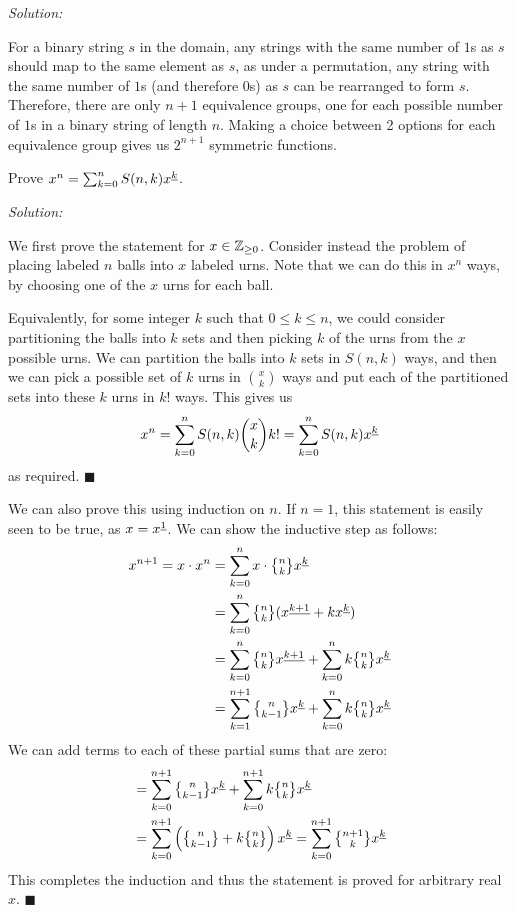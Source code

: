 \documentclass[12pt]{scrartcl}
\newenvironment{problem}[2][Problem]{\begin{trivlist}
\item[\hskip \labelsep {\bfseries #1}\hskip \labelsep {\bfseries #2.}]}{\end{trivlist}}
\newenvironment{solution}
    {\emph{Solution:}
    }
    {
    \qedhere
    }
\begin{document}
\begin{solution}
For a binary string $s$ in the domain, any strings with the same number of $1$s as $s$ should map to the same element as $s$, as under a permutation, any string with the same number of $1$s (and therefore $0$s) as $s$ can be rearranged to form $s$. Therefore, there are only $n+1$ equivalence groups, one for each possible number of $1$s in a binary string of length $n$. Making a choice between 2 options for each equivalence group gives us $\boxed{2^{n+1}}$ symmetric functions. 
\end{solution}


\begin{problem}{10}
Prove $x^n = \sum^n_{k=0} S(n, k) x^{\underline{k}}$. 
\end{problem}

\begin{solution}
We first prove the statement for $x \in \mathbb Z_{\geq 0}$. Consider instead the problem of placing labeled $n$ balls into $x$ labeled urns. Note that we can do this in $x^n$ ways, by choosing one of the $x$ urns for each ball. 

Equivalently, for some integer $k$ such that $0 \leq k \leq n$, we could consider partitioning the balls into $k$ sets and then picking $k$ of the urns from the $x$ possible urns. We can partition the balls into $k$ sets in $S(n, k)$ ways, and then we can pick a possible set of $k$ urns in $\binom{x}{k}$ ways and put each of the partitioned sets into these $k$ urns in $k!$ ways. This gives us 
\[
	x^n = \sum^n_{k=0} S(n, k)\binom{x}{k} k!  = \sum^n_{k=0} S(n, k) x^{\underline{k}}
\]
as required. $\blacksquare$

We can also prove this using induction on $n$. If $n = 1$, this statement is easily seen to be true, as $x = x^{\underline{1}}$. We can show the inductive step as follows: 
\begin{align*}
	x^{n+1} = x \cdot x^n &= \sum_{k=0}^n x \cdot \stirii{n}{k} \ffact{x}{k} \\
	&= \sum_{k=0}^n \stirii{n}{k} (\ffact{x}{k+1} + k \ffact{x}{k}) \\
	&= \sum_{k=0}^n \stirii{n}{k} \ffact{x}{k+1} + \sum_{k=0}^n k \stirii{n}{k} \ffact{x}{k} \\
	&= \sum_{k=1}^{n+1} \stirii{n}{k-1} \ffact{x}{k} + \sum_{k=0}^n k \stirii{n}{k} \ffact{x}{k} 
\end{align*}
We can add terms to each of these partial sums that are zero: 
\begin{align*}
&= \sum_{k=0}^{n+1} \stirii{n}{k-1} \ffact{x}{k} + \sum_{k=0}^{n+1} k \stirii{n}{k} \ffact{x}{k} \\
&= \sum_{k=0}^{n+1} \left(\stirii{n}{k-1} + k \stirii{n}{k} \right)\ffact{x}{k} =  \sum_{k=0}^{n+1} \stirii{n+1}{k} \ffact{x}{k} 
\end{align*}
This completes the induction and thus the statement is proved for arbitrary real $x$. $\blacksquare$
\end{solution}
\end{document}
